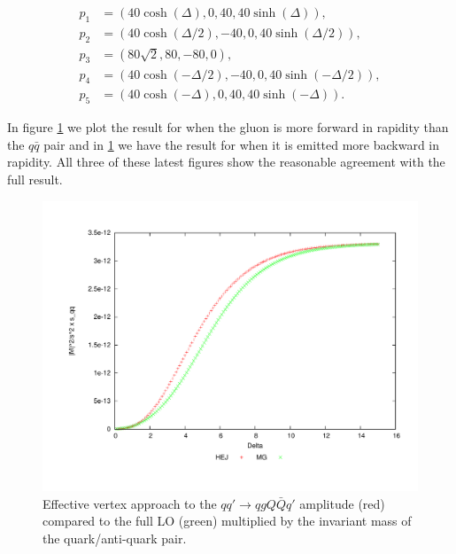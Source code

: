 \begin{equation}
\begin{split}
p_1 & = (40 \cosh(\Delta), 0, 40, 40 \sinh(\Delta)), \\
p_2 & = (40 \cosh(\Delta/2), -40, 0, 40 \sinh(\Delta/2)), \\
p_3 & = (80 \sqrt{2}, 80, -80, 0), \\
p_4 & = (40 \cosh(-\Delta/2), -40, 0, 40 \sinh(-\Delta/2)), \\
p_5 & = (40 \cosh(-\Delta), 0, 40, 40 \sinh(-\Delta)). 
\end{split}
\end{equation}

In figure \ref{fig:central_gfor} we plot the result for when the gluon is more forward in rapidity than the $q\bar{q}$ pair and in \ref{fig:central_gfor} we have the result for when it is emitted more backward in rapidity. All three of these latest figures show the reasonable agreement with the full result. 

\begin{figure}[H]
\centering
\includegraphics[scale=0.44]{Images/qQ_qgqqxQ_sqq.pdf}
\caption{Effective vertex approach to the $qq' \to qgQ\bar{Q}q'$ amplitude (red) compared to the full LO (green) multiplied by the invariant mass of the quark/anti-quark pair.}
\label{fig:central_gfor}
\end{figure}

